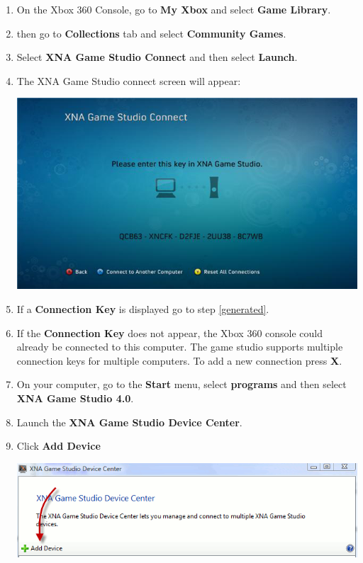 \begin{enumerate}
	\item On the Xbox 360 Console, go to \textbf{My Xbox} and select \textbf{Game Library}. 
	\item then go to \textbf{Collections} tab and select \textbf{Community Games}. 
	\item Select \textbf{XNA Game Studio Connect} and then select \textbf{Launch}. 
	\item The XNA Game Studio connect screen will appear: \\ \begin{center}\includegraphics[scale=0.5]{graphics/connect}\end{center}
	\item If a \textbf{Connection Key} is displayed go to step \ref{generated}. 
	\item If the \textbf{Connection Key} does not appear, the Xbox 360 console could already be connected to this computer. The game studio supports multiple connection keys for multiple computers. To add a new connection press \textbf{X}. 
	\item \label{generated} On your computer, go to the \textbf{Start} menu, select \textbf{programs} and then select \textbf{XNA Game Studio 4.0}. 
	\item Launch the \textbf{XNA Game Studio Device Center}.
	\item Click \textbf{Add Device} \\ \begin{center}\includegraphics[scale=0.75]{graphics/add_device}\end{center} 

\end{enumerate}
